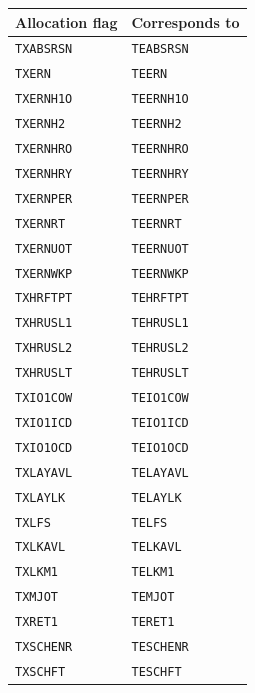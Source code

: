 \documentclass[11pt, a4paper]{article}
\begin{document}
\vspace{1mm}
\begin{longtable}{L{3.5cm} L{12cm}}
\toprule \textbf{Allocation flag} & \textbf{Corresponds to} \\ \midrule \endhead
\bottomrule \endfoot
\texttt{TXABSRSN}   & \texttt{TEABSRSN} \\
 \texttt{TXERN}      & \texttt{TEERN} \\
\texttt{TXERNH1O}   & \texttt{TEERNH1O} \\
 \texttt{TXERNH2}    & \texttt{TEERNH2} \\
\texttt{TXERNHRO}   & \texttt{TEERNHRO} \\
 \texttt{TXERNHRY}   & \texttt{TEERNHRY} \\
\texttt{TXERNPER}   & \texttt{TEERNPER} \\
 \texttt{TXERNRT}    & \texttt{TEERNRT} \\
\texttt{TXERNUOT}   & \texttt{TEERNUOT} \\
 \texttt{TXERNWKP}   & \texttt{TEERNWKP} \\
\texttt{TXHRFTPT}   & \texttt{TEHRFTPT} \\
 \texttt{TXHRUSL1}   & \texttt{TEHRUSL1} \\
\texttt{TXHRUSL2}   & \texttt{TEHRUSL2} \\
 \texttt{TXHRUSLT}   & \texttt{TEHRUSLT} \\
\texttt{TXIO1COW}   & \texttt{TEIO1COW} \\
 \texttt{TXIO1ICD}   & \texttt{TEIO1ICD} \\
\texttt{TXIO1OCD}   & \texttt{TEIO1OCD} \\
 \texttt{TXLAYAVL}   & \texttt{TELAYAVL} \\
\texttt{TXLAYLK}    & \texttt{TELAYLK} \\
 \texttt{TXLFS}      & \texttt{TELFS} \\
\texttt{TXLKAVL}    & \texttt{TELKAVL} \\
 \texttt{TXLKM1}     & \texttt{TELKM1} \\
\texttt{TXMJOT}     & \texttt{TEMJOT} \\
 \texttt{TXRET1}     & \texttt{TERET1} \\
\texttt{TXSCHENR}   & \texttt{TESCHENR} \\
 \texttt{TXSCHFT}    & \texttt{TESCHFT} \\

\end{longtable}
\end{document}
